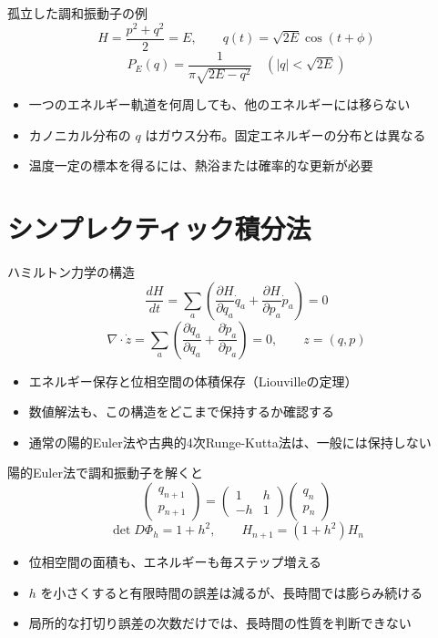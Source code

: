 \documentclass[10pt,aspectratio=169]{beamer}
\begin{document}
\begin{frame}{孤立した調和振動子の例}
\[
H=\frac{p^2+q^2}{2}=E,\qquad
q(t)=\sqrt{2E}\cos(t+\phi)
\]
\[
P_E(q)=\frac{1}{\pi\sqrt{2E-q^2}}\quad (|q|<\sqrt{2E})
\]
\begin{itemize}
\item 一つのエネルギー軌道を何周しても、他のエネルギーには移らない
\item カノニカル分布の $q$ はガウス分布。固定エネルギーの分布とは異なる
\item 温度一定の標本を得るには、熱浴または確率的な更新が必要
\end{itemize}
\end{frame}

\section{シンプレクティック積分法}

\begin{frame}{ハミルトン力学の構造}
\[
\frac{dH}{dt}=\sum_a\left(
\frac{\partial H}{\partial q_a}\dot q_a+
\frac{\partial H}{\partial p_a}\dot p_a\right)=0
\]
\[
\nabla\cdot\dot z=\sum_a\left(
\frac{\partial\dot q_a}{\partial q_a}+
\frac{\partial\dot p_a}{\partial p_a}\right)=0,
\qquad z=(q,p)
\]
\begin{itemize}
\item エネルギー保存と位相空間の体積保存（Liouvilleの定理）
\item 数値解法も、この構造をどこまで保持するか確認する
\item 通常の陽的Euler法や古典的4次Runge-Kutta法は、一般には保持しない
\end{itemize}
\end{frame}

\begin{frame}{陽的Euler法で調和振動子を解くと}
\[
\begin{pmatrix}q_{n+1}\\p_{n+1}\end{pmatrix}
=\begin{pmatrix}1&h\\-h&1\end{pmatrix}
\begin{pmatrix}q_n\\p_n\end{pmatrix}
\]
\[
\det D\Phi_h=1+h^2,\qquad H_{n+1}=(1+h^2)H_n
\]
\begin{itemize}
\item 位相空間の面積も、エネルギーも毎ステップ増える
\item $h$ を小さくすると有限時間の誤差は減るが、長時間では膨らみ続ける
\item 局所的な打切り誤差の次数だけでは、長時間の性質を判断できない
\end{itemize}
\end{frame}
\end{document}
